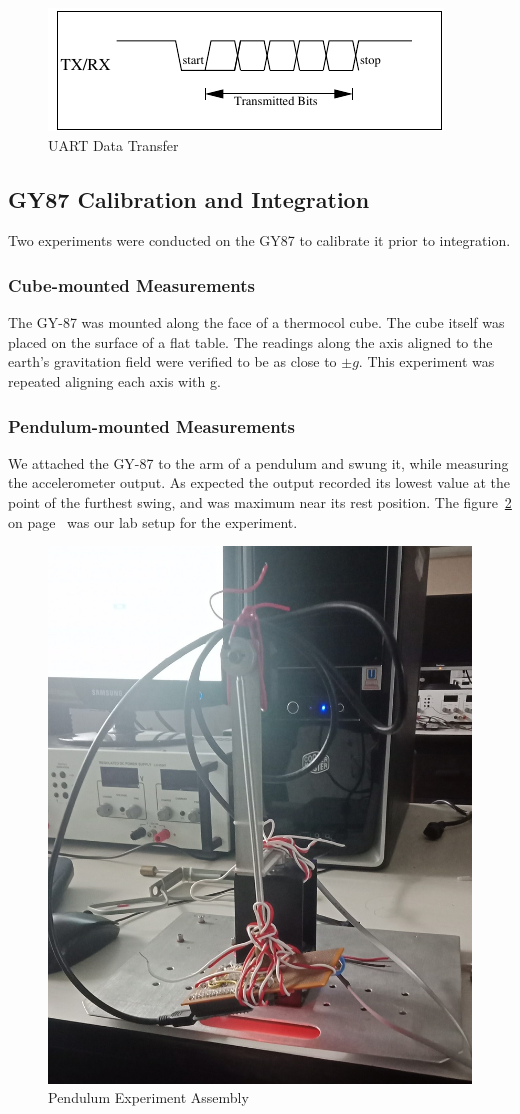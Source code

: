 \documentclass[11pt, a4paper]{article}
\begin{document}
\begin{figure}[htb]
    \centering
    \includegraphics[width=\linewidth]{UART_Timing.pdf}
    \caption{UART Data Transfer}
    \label{fig:uart_timing}
\end{figure}

\subsection{GY87 Calibration and Integration}
Two experiments were conducted on the GY87 to calibrate it prior to
integration.

\subsubsection{Cube-mounted Measurements}
The GY-87 was mounted along the face of a thermocol cube. The cube itself was
placed on the surface of a flat table. The readings along the axis aligned to
the earth's gravitation field were verified to be as close to $\pm g$. This
experiment was repeated aligning each axis with g.

\subsubsection{Pendulum-mounted Measurements}
We attached the GY-87 to the arm of a pendulum and swung it, while measuring
the accelerometer output. As expected the output recorded its lowest value at
the point of the furthest swing, and was maximum near its rest position. The
figure~\ref{fig:pendulum} on page~\pageref{fig:pendulum} was our lab setup for
the experiment. 

\begin{figure}[htb]
    \centering
    \includegraphics[width=0.5\linewidth]{pendulum.jpg}
    \caption{Pendulum Experiment Assembly}
    \label{fig:pendulum}
\end{figure}
\end{document}
